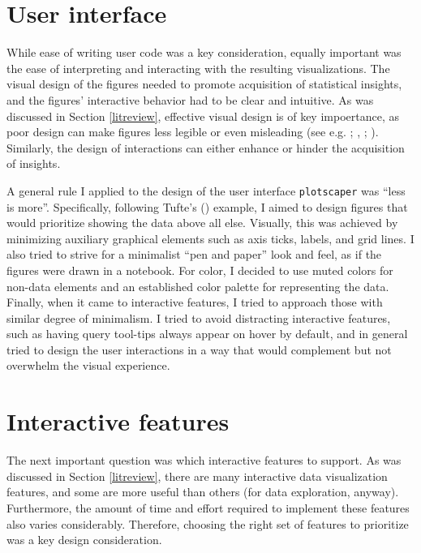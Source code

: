 \documentclass[
]{book}
\theoremstyle{definition}
\theoremstyle{definition}
\theoremstyle{definition}
\theoremstyle{definition}
\theoremstyle{remark}
\begin{document}
\section{User interface}\label{user-interface}

While ease of writing user code was a key consideration, equally important was the ease of interpreting and interacting with the resulting visualizations. The visual design of the figures needed to promote acquisition of statistical insights, and the figures' interactive behavior had to be clear and intuitive. As was discussed in Section \ref{litreview}, effective visual design is of key impoertance, as poor design can make figures less legible or even misleading (see e.g. ; , ; ). Similarly, the design of interactions can either enhance or hinder the acquisition of insights.

A general rule I applied to the design of the user interface \texttt{plotscaper} was ``less is more''. Specifically, following Tufte's () example, I aimed to design figures that would prioritize showing the data above all else. Visually, this was achieved by minimizing auxiliary graphical elements such as axis ticks, labels, and grid lines. I also tried to strive for a minimalist ``pen and paper'' look and feel, as if the figures were drawn in a notebook. For color, I decided to use muted colors for non-data elements and an established color palette for representing the data. Finally, when it came to interactive features, I tried to approach those with similar degree of minimalism. I tried to avoid distracting interactive features, such as having query tool-tips always appear on hover by default, and in general tried to design the user interactions in a way that would complement but not overwhelm the visual experience.

\section{Interactive features}\label{interactive-features}

The next important question was which interactive features to support. As was discussed in Section \ref{litreview}, there are many interactive data visualization features, and some are more useful than others (for data exploration, anyway). Furthermore, the amount of time and effort required to implement these features also varies considerably. Therefore, choosing the right set of features to prioritize was a key design consideration.
\end{document}
